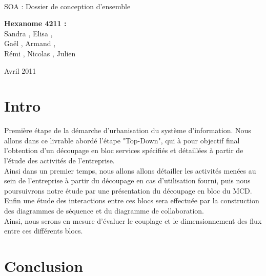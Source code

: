 \documentclass[a4paper]{article}
\begin{document}
\begin{titlepage}
~ 
\vfill
	\begin{center}
		\begin{Huge}
		SOA : Dossier de conception d'ensemble\\
		\end{Huge} 
\vfill
		\textbf{Hexanome 4211 :} 
		\\Sandra {}, Elisa , 
		\\Gaël , Armand , 
		\\Rémi , Nicolas , Julien \\

\vfill		
		\begin{Large}
		Avril 2011
		\end{Large}
\vfill

	\end{center}
\vfill
\end{titlepage}

\newpage
\tableofcontents
\newpage

\section*{Intro}

Première étape de la démarche d'urbanisation du système d'information. Nous allons dans ce livrable abordé l'étape "Top-Down", qui à pour objectif final l'obtention d'un découpage en bloc services spécifiés et détaillées à partir de l'étude des activités de l'entreprise.\\
Ainsi dans un premier temps, nous allons allons détailler les activités menées au sein de l'entreprise à partir du découpage en cas d'utilisation fourni, puis nous poursuivrons notre étude par une présentation du découpage en bloc du MCD. Enfin une étude des interactions entre ces blocs sera effectuée par la construction des diagrammes de séquence et du diagramme de collaboration.\\
Ainsi, nous serons en mesure d'évaluer le couplage et le dimensionnement des flux entre ces différents blocs.







\section*{Conclusion}
\end{document}
